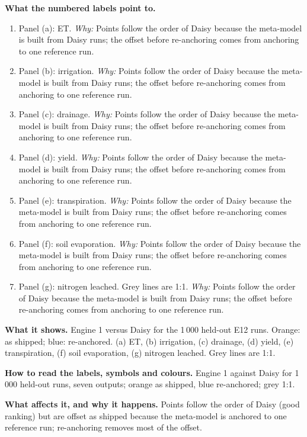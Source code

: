 \textbf{What the numbered labels point to.}
\begin{enumerate}[nosep,label=\protect\circled{\arabic*}]
\item Panel (a): ET. \emph{Why:} Points follow the order of Daisy because the meta-model is built from Daisy runs; the offset before re-anchoring comes from anchoring to one reference run.
\item Panel (b): irrigation. \emph{Why:} Points follow the order of Daisy because the meta-model is built from Daisy runs; the offset before re-anchoring comes from anchoring to one reference run.
\item Panel (c): drainage. \emph{Why:} Points follow the order of Daisy because the meta-model is built from Daisy runs; the offset before re-anchoring comes from anchoring to one reference run.
\item Panel (d): yield. \emph{Why:} Points follow the order of Daisy because the meta-model is built from Daisy runs; the offset before re-anchoring comes from anchoring to one reference run.
\item Panel (e): transpiration. \emph{Why:} Points follow the order of Daisy because the meta-model is built from Daisy runs; the offset before re-anchoring comes from anchoring to one reference run.
\item Panel (f): soil evaporation. \emph{Why:} Points follow the order of Daisy because the meta-model is built from Daisy runs; the offset before re-anchoring comes from anchoring to one reference run.
\item Panel (g): nitrogen leached. Grey lines are 1:1. \emph{Why:} Points follow the order of Daisy because the meta-model is built from Daisy runs; the offset before re-anchoring comes from anchoring to one reference run.
\end{enumerate}

\textbf{What it shows.} Engine 1 versus Daisy for the 1\,000 held-out E12 runs. Orange: as shipped; blue: re-anchored. (a) ET, (b) irrigation, (c) drainage, (d) yield, (e) transpiration, (f) soil evaporation, (g) nitrogen leached. Grey lines are 1:1.

\textbf{How to read the labels, symbols and colours.} Engine 1 against Daisy for 1\,000 held-out runs, seven outputs; orange as shipped, blue re-anchored; grey 1:1.

\textbf{What affects it, and why it happens.} Points follow the order of Daisy (good ranking) but are offset as shipped because the meta-model is anchored to one reference run; re-anchoring removes most of the offset.


